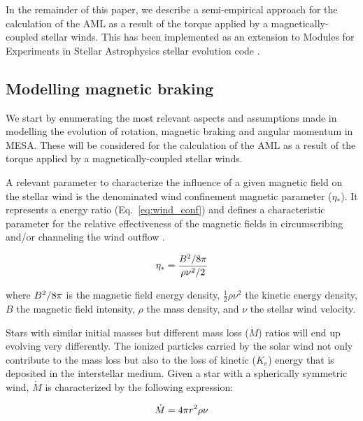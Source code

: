 \documentclass[fleqn,usenatbib]{mnras}
\begin{document}
In the remainder of this paper, we describe a semi-empirical approach for the calculation of the AML as a result of the torque applied by a magnetically-coupled stellar winds. This has been implemented as an extension to Modules for Experiments in Stellar Astrophysics stellar evolution code \citep[MESA; ][]{Paxton2011, Paxton2013,Paxton2015, Paxton2018, Paxton2019}.

\subsection{Modelling magnetic braking} \label{mod_mb}
We start by enumerating the most relevant aspects and assumptions made in modelling the evolution of rotation, magnetic braking and angular momentum in MESA. These will be considered for the calculation of the AML as a result of the torque applied by a magnetically-coupled stellar winds.\par 

A relevant parameter to characterize the influence of a given magnetic field on the stellar wind is the denominated wind confinement magnetic parameter ($\eta_*$). It represents a energy ratio (Eq.~\ref{eq:wind_conf}) and defines a characteristic parameter for the relative effectiveness of the magnetic fields in circumscribing and/or channeling the wind outflow \citep{UdDoula2002}.\par

\begin{ceqn}
\begin{equation}
    \eta_* = \frac{B^{2}/8\pi}{\rho\nu^2/2} \label{eq:wind_conf}
\end{equation}
\end{ceqn}

where $B^{2}/8\pi$ is the magnetic field energy density, $\frac{1}{2}\rho\nu^{2}$ the kinetic energy density, $B$ the magnetic field intensity, $\rho$ the mass density, and $\nu$ the stellar wind velocity.\par

Stars with similar initial masses but different mass loss ($\Dot{M}$) ratios will end up evolving very differently. The ionized particles carried by the solar wind not only contribute to the mass loss but also to the loss of kinetic ($K_e$) energy that is deposited in the interstellar medium. Given a star with a spherically symmetric wind, $\Dot{M}$ is characterized by the following expression:

\begin{ceqn}
\begin{equation}
    \Dot{M} = 4\pi r^2\rho\nu \label{eq:mass_loss}
\end{equation}
\end{ceqn}
\end{document}
